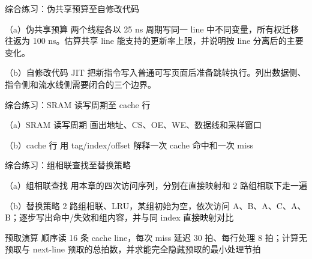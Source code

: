 \begin{chapterexercise}{综合练习：伪共享预算至自修改代码}
\begin{exercisesubproblem}{（a）伪共享预算}
两个线程各以 25 ns 周期写同一 line 中不同变量，所有权迁移往返为 100 ns。估算共享 line 能支持的更新率上限，并说明按 line 分离后的主要变化。
\end{exercisesubproblem}
\begin{exercisesubproblem}{（b）自修改代码}
JIT 把新指令写入普通可写页面后准备跳转执行。列出数据侧、指令侧和流水线侧需要闭合的三个边界。
\end{exercisesubproblem}
\end{chapterexercise}

\begin{chapterexercise}{综合练习：SRAM 读写周期至 cache 行}
\begin{exercisesubproblem}{（a）SRAM 读写周期}
画出地址、CS、OE、WE、数据线和采样窗口
\end{exercisesubproblem}
\begin{exercisesubproblem}{（b）cache 行}
用 tag/index/offset 解释一次 cache 命中和一次 miss
\end{exercisesubproblem}
\end{chapterexercise}

\begin{chapterexercise}{综合练习：组相联查找至替换策略}
\begin{exercisesubproblem}{（a）组相联查找}
用本章的四次访问序列，分别在直接映射和 2 路组相联下走一遍
\end{exercisesubproblem}
\begin{exercisesubproblem}{（b）替换策略}
2 路组相联、LRU，某组初始为空，依次访问 A、B、A、C、A、B；逐步写出命中/失效和组内容，并与同 index 直接映射对比
\end{exercisesubproblem}
\end{chapterexercise}

\begin{chapterexercise}{预取演算}
顺序读 16 条 cache line，每次 miss 延迟 30 拍、每行处理 8 拍；计算无预取与 next-line 预取的总拍数，并求能完全隐藏预取的最小处理节拍
\end{chapterexercise}

